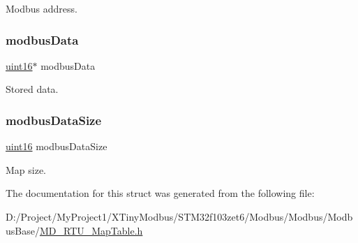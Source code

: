 Modbus address. 

\mbox{\label{struct_p_map_table_item_a865f14cfddaf31e0868812dcb43f3a05}} 
\subsubsection{\texorpdfstring{modbus\+Data}{modbusData}}
{\footnotesize\ttfamily \mbox{\hyperlink{_m_d___r_t_u___type_8h_a05f6b0ae8f6a6e135b0e290c25fe0e4e}{uint16}}$\ast$ modbus\+Data}



Stored data. 

\mbox{\label{struct_p_map_table_item_a316475ec03756ea413b4887594e05e93}} 
\subsubsection{\texorpdfstring{modbus\+Data\+Size}{modbusDataSize}}
{\footnotesize\ttfamily \mbox{\hyperlink{_m_d___r_t_u___type_8h_a05f6b0ae8f6a6e135b0e290c25fe0e4e}{uint16}} modbus\+Data\+Size}



Map size. 



The documentation for this struct was generated from the following file\+:\begin{DoxyCompactItemize}
\item 
D\+:/\+Project/\+My\+Project1/\+X\+Tiny\+Modbus/\+S\+T\+M32f103zet6/\+Modbus/\+Modbus/\+Modbus\+Base/\mbox{\hyperlink{_m_d___r_t_u___map_table_8h}{M\+D\+\_\+\+R\+T\+U\+\_\+\+Map\+Table.\+h}}\end{DoxyCompactItemize}
